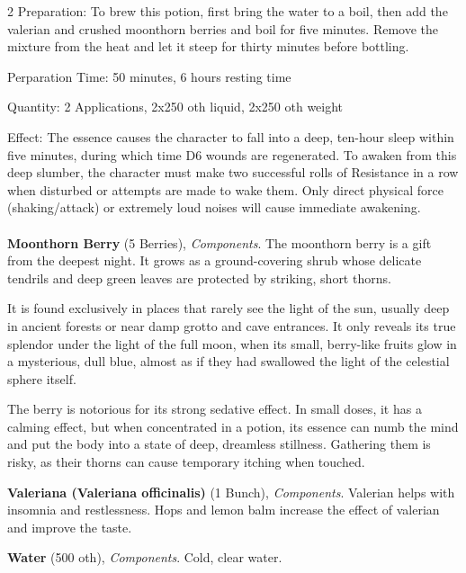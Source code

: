\begin{multicols}{2}
    Preparation:
To brew this potion, first bring the water to a boil, then add the valerian and crushed moonthorn berries and boil for five minutes. Remove the mixture from the heat and let it steep for thirty minutes before bottling.

Perparation Time: 50 minutes, 6 hours resting time

Quantity: 2 Applications, 2x250 oth liquid, 2x250 oth weight

Effect:
The essence causes the character to fall into a deep, ten-hour sleep within five minutes, during which time D6 wounds are regenerated. To awaken from this deep slumber, the character must make two successful rolls of Resistance in a row when disturbed or attempts are made to wake them. Only direct physical force (shaking/attack) or extremely loud noises will cause immediate awakening.

    \paragraph{}
    \begin{denseitemize}
        \item \textbf{Moonthorn Berry} (5 Berries), \textit{Components}.
        The moonthorn berry is a gift from the deepest night. It grows as a ground-covering shrub whose delicate tendrils and deep green leaves are protected by striking, short thorns.

It is found exclusively in places that rarely see the light of the sun, usually deep in ancient forests or near damp grotto and cave entrances. It only reveals its true splendor under the light of the full moon, when its small, berry-like fruits glow in a mysterious, dull blue, almost as if they had swallowed the light of the celestial sphere itself.

The berry is notorious for its strong sedative effect. In small doses, it has a calming effect, but when concentrated in a potion, its essence can numb the mind and put the body into a state of deep, dreamless stillness. Gathering them is risky, as their thorns can cause temporary itching when touched.
        \item \textbf{Valeriana (Valeriana officinalis)} (1 Bunch), \textit{Components}.
        Valerian helps with insomnia and restlessness. Hops and lemon balm increase the effect of valerian and improve the taste.
        \item \textbf{Water} (500 oth), \textit{Components}.
        Cold, clear water.
    \end{denseitemize}



\end{multicols}
